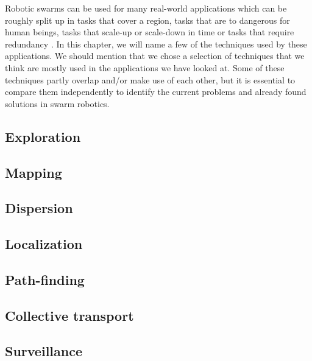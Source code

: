 Robotic swarms can be used for many real-world applications which can be roughly split up in tasks that cover a region, tasks that are to dangerous for human beings, tasks that scale-up or scale-down in time or tasks that require redundancy \cite{csahin2005swarm}. In this chapter, we will name a few of the techniques used by these applications. We should mention that we chose a selection of techniques that we think are mostly used in the applications we have looked at. Some of these techniques partly overlap and/or make use of each other, but it is essential to compare them independently to identify the current problems and already found solutions in swarm robotics.

  \subsection{Exploration}
  
  
  \subsection{Mapping}
  
  
  \subsection{Dispersion}
 

  \subsection{Localization}
 

 \subsection{Path-finding}
 

\subsection{Collective transport}


\subsection{Surveillance}

